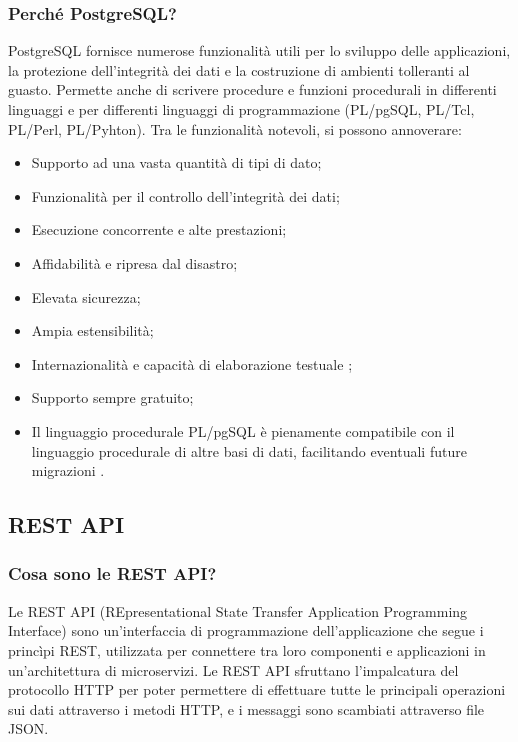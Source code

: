             \subsubsection{Perché PostgreSQL?}
                PostgreSQL fornisce numerose funzionalità utili per lo sviluppo delle applicazioni, la protezione dell'integrità dei dati e la costruzione di ambienti tolleranti al guasto. Permette anche di scrivere procedure e funzioni procedurali in differenti linguaggi e per differenti linguaggi di programmazione (PL/pgSQL, PL/Tcl, PL/Perl, PL/Pyhton). Tra le funzionalità notevoli, si possono annoverare:
                \begin{itemize}
                    \item Supporto ad una vasta quantità di tipi di dato;
                    \item Funzionalità per il controllo dell'integrità dei dati;
                    \item Esecuzione concorrente e alte prestazioni;
                    \item Affidabilità e ripresa dal disastro;
                    \item Elevata sicurezza;
                    \item Ampia estensibilità;
                    \item Internazionalità e capacità di elaborazione testuale \cite{PostgreSQL1}; 
                    \item Supporto sempre gratuito;
                    \item Il linguaggio procedurale PL/pgSQL è pienamente compatibile con il linguaggio procedurale di altre basi di dati, facilitando eventuali future migrazioni \cite{Hevodata1}.
                \end{itemize}

        \subsection{REST API}
            \subsubsection{Cosa sono le REST API? \cite{IBM1}}
                Le REST API (REpresentational State Transfer Application Programming Interface) sono un'interfaccia di programmazione dell'applicazione che segue i princìpi REST, utilizzata per connettere tra loro componenti e applicazioni in un'architettura di microservizi. Le REST API sfruttano l'impalcatura del protocollo HTTP per poter permettere di effettuare tutte le principali operazioni sui dati attraverso i metodi HTTP, e i messaggi sono scambiati attraverso file JSON.
